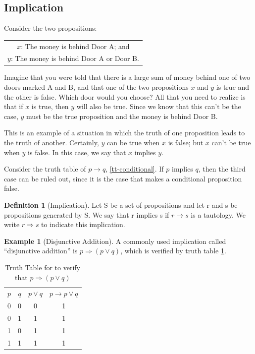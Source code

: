 \documentclass[10pt,]{book}
\theoremstyle{plain}
\theoremstyle{definition}
\newtheorem{definition}[theorem]{Definition}
\theoremstyle{definition}
\theoremstyle{definition}
\newtheorem{example}[theorem]{Example}
\theoremstyle{definition}
\begin{document}
\subsection[Implication]{Implication}\label{subsection-7}
Consider the two propositions:%
\leavevmode%
\begin{table}
\centering
\begin{tabular}{c}
\(x\): The money is behind Door A; and\tabularnewline[0pt]
\(y\): The money is behind Door A or Door B.
\end{tabular}
\end{table}
\par
Imagine that you were told that there is a large sum of money behind one of two doors marked A and B, and that one of the two propositions \(x\) and \(y\) is true and the other is false. Which door would you choose? All that you need to realize is that if \(x\) is true, then \(y\) will also be true. Since we know that this can't be the case, \(y\) must be the true proposition and the money is behind Door B.%
\par
This is an example of a situation in which the truth of one proposition leads to the truth of another. Certainly, \(y\) can be true when \(x\) is false; but \(x\) can't be true when \(y\) is false. In this case, we say that \(x\) implies  \(y\).%
\par
Consider the truth table of \(p \to  q\),  \hyperref[tt-conditional]{\ref{tt-conditional}}. If \(p\) implies \(q\), then the third case can be ruled out, since it is the case that makes a conditional proposition false.%
\begin{definition}[Implication]\label{def-implication}
\label{notation-9}
 Let S be a set of propositions and let r and s be propositions generated by S. We say that r implies s if \(r \to s\) is a tautology. We write \(r \Rightarrow  s\) to indicate this implication.%
\end{definition}
\begin{example}[Disjunctive Addition]\label{ex-disjunctive-addition}
A commonly used implication called ``disjunctive addition'' is  \(p \Rightarrow (p \lor  q)\), which is verified by truth table \hyperref[tt-disjunctive-addition]{\ref{tt-disjunctive-addition}}.%
\end{example}
\leavevmode%
\begin{table}
\centering
\begin{tabular}{cccc}
\( p\) &\( q\) &\( p\lor q \)&\( p\to p\lor q \)\tabularnewline[0pt]
 0 & 0 & 0 & 1 \tabularnewline[0pt]
 0 & 1 & 1 & 1 \tabularnewline[0pt]
 1 & 0 & 1 & 1 \tabularnewline[0pt]
 1 & 1 & 1 & 1 
\end{tabular}
\caption{Truth Table for to verify that \(p \Rightarrow (p \lor  q)\)\label{tt-disjunctive-addition}}
\end{table}
\end{document}
